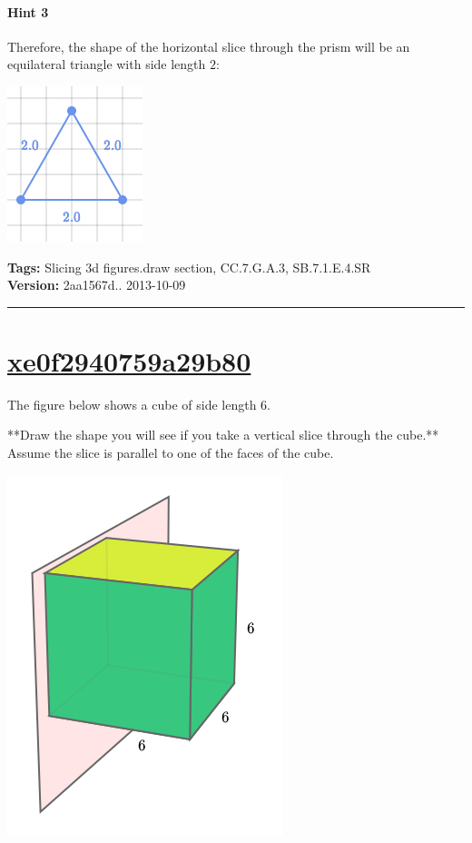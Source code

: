 \documentclass[twocolumn,10pt]{article}
\def\shrinkfactor{0.4}
\begin{document}
\paragraph{Hint 3}Therefore, the shape of the horizontal slice through the prism will be an equilateral triangle with side length $2$:  

\includegraphics[scale=\shrinkfactor]{figures/f8d6ecceeaa6abcdead884e4f8edd48e735a5e80.png}



\medskip
\noindent
\textbf{Tags:} {\footnotesize Slicing 3d figures.draw section, CC.7.G.A.3, SB.7.1.E.4.SR}\\
\textbf{Version:} 2aa1567d.. 2013-10-09
\smallskip\hrule





\section{\href{https://www.khanacademy.org/devadmin/content/items/xe0f2940759a29b80}{xe0f2940759a29b80}}

\noindent
The figure below shows a cube of side length $6$.  

**Draw the shape you will see if you take a vertical slice through the cube.**   Assume the slice is parallel to one of the faces of the cube.


\includegraphics[scale=\shrinkfactor]{figures/294f9514eb8ff76c2ef01fa15cac104d58e65bc8.png}
\end{document}
